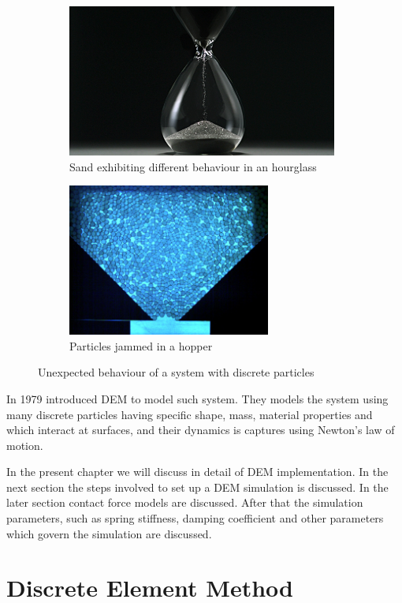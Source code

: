 \begin{figure}[h]
  \begin{subfigure}{0.5\textwidth}
    \includegraphics[width=0.9\linewidth, height=5cm]{dem/doc_images/hourglass}
    \caption{Sand exhibiting different behaviour in an hourglass}
    \label{fig:hourglass}
  \end{subfigure}
  \begin{subfigure}{0.5\textwidth}
    \includegraphics[width=0.9\linewidth, height=5cm]{dem/doc_images/hopper_jam}
    \caption{Particles jammed in a hopper}
    \label{fig:hopper_jam}
  \end{subfigure}

  \caption{Unexpected behaviour of a system with discrete particles}
  \label{fig:dem_introduction}
\end{figure}

In 1979 \citeauthor{Cundall_1979} introduced DEM to model such system. They
models the system using many discrete particles having specific shape, mass,
material properties and which interact at surfaces, and their dynamics is
captures using Newton's law of motion.

In the present chapter we will discuss in detail of DEM implementation. In the
next section the steps involved to set up a DEM simulation is discussed. In the
later section contact force models are discussed. After that the simulation
parameters, such as spring stiffness, damping coefficient and other parameters
which govern the simulation are discussed.


\section{Discrete Element Method}

